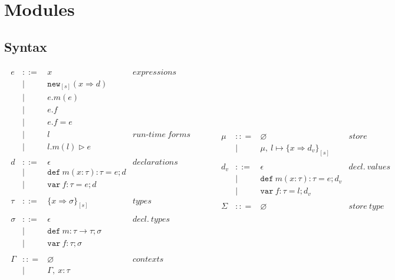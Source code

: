 \documentclass{llncs}
\newcommand{\keywadj}[1]{\mathtt{#1}}
\newcommand{\keyw}[1]{\keywadj{#1}~}
\begin{document}
\section{Modules}

\subsection{Syntax}

\[
\begin{array}{lll}
\begin{array}{lllr}
e & ::= & x & expressions \\
& | & \keywadj{new}_{[s]}(x \Rightarrow d) \\
& | & e.m(e)\\
& | & e.f \\
& | & e.f = e \\
& | & l & run\mbox{-}time~forms\\
& | & l.m(l) \rhd e \\
&&\\
d & ::= & \epsilon & declarations \\
  & |   & \keyw{def} m(x:\tau):\tau = e; d \\
  & |   & \keyw{var} f:\tau = e; d \\
&&\\
\tau & ::= & \{ x \Rightarrow \sigma \}_{[s]} & types \\
&&\\
\sigma & ::= & \epsilon & decl.~ types \\
       & |   & \keyw{def} m:\tau \rightarrow \tau; \sigma \\
       & |   & \keyw{var} f:\tau; \sigma \\
&&\\
\Gamma & :: = & \varnothing & contexts\\
& | & \Gamma,~x : \tau\\
\end{array}
& ~~~~~~
&
\begin{array}{lllr}
\mu & :: = & \varnothing & store\\
& | & \mu,~l \mapsto \{ x \Rightarrow d_v \}_{[s]}\\
&&\\
d_v & ::= & \epsilon & decl.~ values \\
  & |   & \keyw{def} m(x:\tau):\tau = e; d_v \\
  & |   & \keyw{var} f:\tau = l; d_v \\
&&\\
\Sigma & :: = & \varnothing & store~type\\

\end{array}
\end{array}\]
\end{document}
